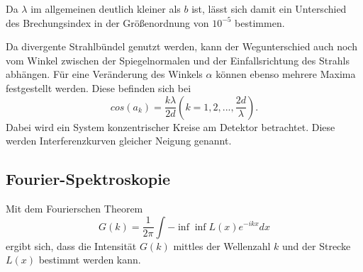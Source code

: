 Da $\lambda$ im allgemeinen deutlich kleiner als $b$ ist, lässt sich damit ein 
Unterschied des Brechungsindex in der Größenordnung von $10^{-5}$ bestimmen. 

Da divergente Strahlbündel genutzt werden, kann der Wegunterschied auch noch vom Winkel 
zwischen der Spiegelnormalen und der Einfallsrichtung des Strahls abhängen. Für eine 
Veränderung des Winkels $\alpha$ können ebenso mehrere Maxima festgestellt werden. 
Diese befinden sich bei 
\begin{equation}
    cos (a_k)= \frac{k \lambda}{2 d} (k= 1, 2, ..., \frac{2d}{\lambda}).
\end{equation}
Dabei wird ein System konzentrischer Kreise am Detektor betrachtet. Diese werden 
Interferenzkurven gleicher Neigung genannt. 

\subsection{Fourier-Spektroskopie}

Mit dem Fourierschen Theorem 
\begin{equation}
    G(k)= \frac{1}{2\pi} \int{-\inf}{\inf} L(x) e^{-i k x} dx
    \label{eqn:fourier}
\end{equation}
ergibt sich, dass die Intensität $G(k)$ mittles der Wellenzahl $k$ und der Strecke 
$L(x)$ bestimmt werden kann.